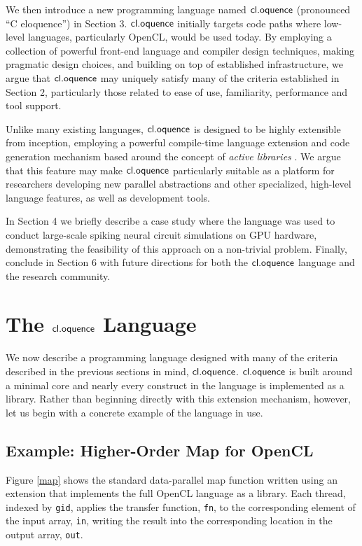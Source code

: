 \documentclass[10pt, conference, compsocconf]{IEEEtran}
\begin{document}
We then introduce a new programming language named $\textsf{cl.oquence}$ (pronounced ``C eloquence'') in Section 3. $\textsf{cl.oquence}$ initially targets code paths where low-level languages, particularly OpenCL, would be used today. By employing a collection of powerful front-end language and compiler design techniques, making pragmatic design choices, and building on top of established infrastructure, we argue that $\textsf{cl.oquence}$ may uniquely satisfy many of the criteria established in Section 2, particularly those related to ease of use, familiarity, performance and tool support.

Unlike many existing languages, $\textsf{cl.oquence}$ is designed to be highly extensible from inception, employing a powerful compile-time language extension and code generation mechanism based around the concept of {\it active libraries} \cite{activelibraries}. We argue that this feature may make $\textsf{cl.oquence}$ particularly suitable as a platform for researchers developing new parallel abstractions and other specialized, high-level language features, as well as  development tools.

In Section 4 we briefly describe a case study where the language was used to conduct large-scale spiking neural circuit simulations on GPU hardware, demonstrating the feasibility of this approach on a non-trivial problem. Finally, conclude in Section 6 with future directions for both the $\textsf{cl.oquence}$ language and the research community.


\section{The $\textsf{cl.oquence}$ Language}
We now describe a programming language designed with many of the criteria described in the previous sections in mind, $\textsf{cl.oquence}$. $\textsf{cl.oquence}$ is built around a minimal core and nearly every construct in the language is implemented as a library. Rather than beginning directly with this extension mechanism, however, let us begin with a concrete example of the language in use.

\subsection{Example: Higher-Order Map for OpenCL}
Figure \ref{map} shows the standard data-parallel map function written using an extension that implements the full OpenCL language as a library. Each thread, indexed by \verb|gid|, applies the transfer function, \verb|fn|, to the  corresponding element of the input array, \verb|in|, writing the result into the corresponding location in the output array, \verb|out|.
\end{document}
